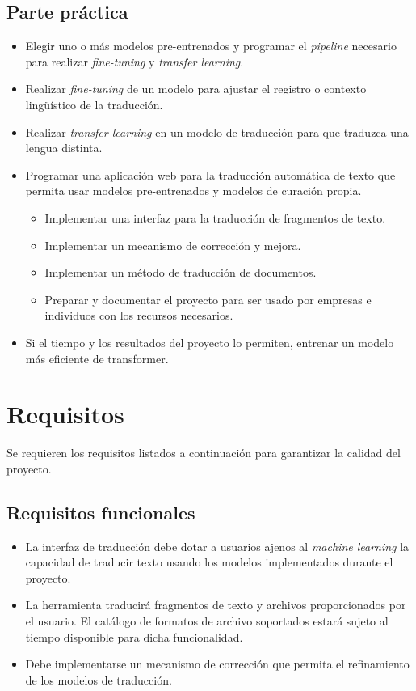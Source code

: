 \subsection*{Parte práctica}
    \begin{itemize}
        \item Elegir uno o más modelos pre-entrenados y programar el \textit{pipeline} necesario para realizar \textit{fine-tuning} y \textit{transfer learning}.
        \item Realizar \textit{fine-tuning} de un modelo para ajustar el registro o contexto
        lingüístico de la traducción.
        \item Realizar \textit{transfer learning} en un modelo de traducción para que traduzca
        una lengua distinta.
        \item Programar una aplicación web para la traducción automática de texto que permita
        usar modelos pre-entrenados y modelos de curación propia.
            \begin{itemize}
                \item Implementar una interfaz para la traducción de fragmentos de texto.
                \item Implementar un mecanismo de corrección y mejora.
                \item Implementar un método de traducción de documentos.
                \item Preparar y documentar el proyecto para ser usado por empresas e individuos con
                    los recursos necesarios.
            \end{itemize}
        \item Si el tiempo y los resultados del proyecto lo permiten, entrenar un modelo más eficiente
            de transformer.
    \end{itemize}



\section{Requisitos}
Se requieren los requisitos listados a continuación para garantizar la calidad del proyecto.

\subsection{Requisitos funcionales}
\begin{itemize}
    \item La interfaz de traducción debe dotar a usuarios ajenos al \textit{machine learning} la capacidad
    de traducir texto usando los modelos implementados durante el proyecto.
    \item La herramienta traducirá fragmentos de texto y archivos proporcionados por el usuario. 
    El catálogo de formatos de archivo soportados estará sujeto al tiempo disponible para
    dicha funcionalidad.
    \item Debe implementarse un mecanismo de corrección que permita el refinamiento de los modelos
    de traducción.
\end{itemize}


